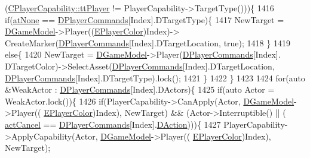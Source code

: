 \begin{DoxyCode}
      (\hyperlink{classCPlayerCapability_a9d3450ed1532fd536bd6cbb1e2eef02fafa6672fe0ac4e39cb5908cd5438b824f}{CPlayerCapability::ttPlayer} != PlayerCapability->TargetType()))\{
1416                     \textcolor{keywordflow}{if}(\hyperlink{GameDataTypes_8h_a5600d4fc433b83300308921974477feca82fb51718e2c00981a2d37bc6fe92593}{atNone} == \hyperlink{classCApplicationData_a2df1addeb7622233f72dc056bbcf31a1}{DPlayerCommands}[Index].DTargetType)\{
1417                         NewTarget = \hyperlink{classCApplicationData_a32b50c7c1cbac3cfd67c7f775b1d6fee}{DGameModel}->Player((\hyperlink{GameDataTypes_8h_aafb0ca75933357ff28a6d7efbdd7602f}{EPlayerColor})Index)->
      CreateMarker(\hyperlink{classCApplicationData_a2df1addeb7622233f72dc056bbcf31a1}{DPlayerCommands}[Index].DTargetLocation, \textcolor{keyword}{true});
1418                     \}
1419                     \textcolor{keywordflow}{else}\{
1420                         NewTarget = \hyperlink{classCApplicationData_a32b50c7c1cbac3cfd67c7f775b1d6fee}{DGameModel}->Player(\hyperlink{classCApplicationData_a2df1addeb7622233f72dc056bbcf31a1}{DPlayerCommands}[Index].
      DTargetColor)->SelectAsset(\hyperlink{classCApplicationData_a2df1addeb7622233f72dc056bbcf31a1}{DPlayerCommands}[Index].DTargetLocation, 
      \hyperlink{classCApplicationData_a2df1addeb7622233f72dc056bbcf31a1}{DPlayerCommands}[Index].DTargetType).lock();
1421                     \}
1422                 \}
1423                 
1424                 \textcolor{keywordflow}{for}(\textcolor{keyword}{auto} &WeakActor : \hyperlink{classCApplicationData_a2df1addeb7622233f72dc056bbcf31a1}{DPlayerCommands}[Index].DActors)\{
1425                     \textcolor{keywordflow}{if}(\textcolor{keyword}{auto} Actor = WeakActor.lock())\{
1426                         \textcolor{keywordflow}{if}(PlayerCapability->CanApply(Actor, \hyperlink{classCApplicationData_a32b50c7c1cbac3cfd67c7f775b1d6fee}{DGameModel}->Player((
      \hyperlink{GameDataTypes_8h_aafb0ca75933357ff28a6d7efbdd7602f}{EPlayerColor})Index), NewTarget) && (Actor->Interruptible() || (
      \hyperlink{GameDataTypes_8h_a35b98ce26aca678b03c6f9f76e4778ceaec5e11ffc62be241b4f6673586b35a6b}{actCancel} == \hyperlink{classCApplicationData_a2df1addeb7622233f72dc056bbcf31a1}{DPlayerCommands}[Index].\hyperlink{structSPlayerCommandRequest_a80897bbccf2c4e0b148a7aa815a926c6}{DAction})))\{
1427                             PlayerCapability->ApplyCapability(Actor, \hyperlink{classCApplicationData_a32b50c7c1cbac3cfd67c7f775b1d6fee}{DGameModel}->Player((
      \hyperlink{GameDataTypes_8h_aafb0ca75933357ff28a6d7efbdd7602f}{EPlayerColor})Index), NewTarget);

\end{DoxyCode}
